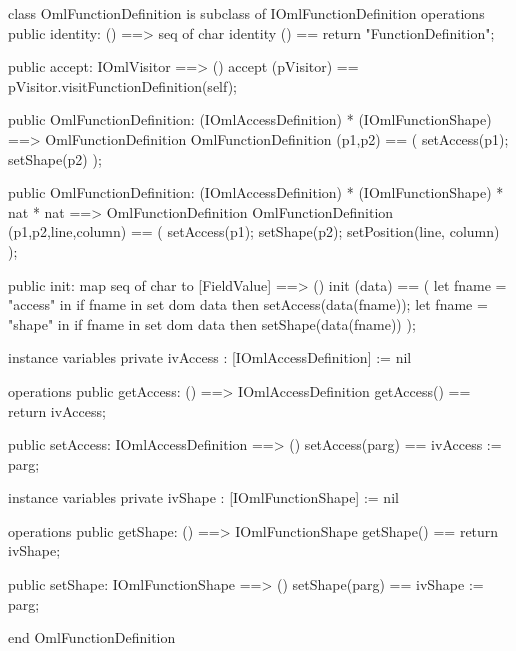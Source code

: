 \begin{vdm_al}
class OmlFunctionDefinition is subclass of IOmlFunctionDefinition
operations
  public identity: () ==> seq of char
  identity () == return "FunctionDefinition";

  public accept: IOmlVisitor ==> ()
  accept (pVisitor) == pVisitor.visitFunctionDefinition(self);

  public OmlFunctionDefinition:
    (IOmlAccessDefinition) *
    (IOmlFunctionShape) ==> OmlFunctionDefinition
  OmlFunctionDefinition (p1,p2) == 
    ( setAccess(p1);
      setShape(p2) );

  public OmlFunctionDefinition:
    (IOmlAccessDefinition) *
    (IOmlFunctionShape) *
    nat *
    nat ==> OmlFunctionDefinition
  OmlFunctionDefinition (p1,p2,line,column) == 
    ( setAccess(p1);
      setShape(p2);
      setPosition(line, column) );

  public init: map seq of char to [FieldValue] ==> ()
  init (data) ==
    ( let fname = "access" in
        if fname in set dom data
        then setAccess(data(fname));
      let fname = "shape" in
        if fname in set dom data
        then setShape(data(fname)) );

instance variables
  private ivAccess : [IOmlAccessDefinition] := nil

operations
  public getAccess: () ==> IOmlAccessDefinition
  getAccess() == return ivAccess;

  public setAccess: IOmlAccessDefinition ==> ()
  setAccess(parg) == ivAccess := parg;

instance variables
  private ivShape : [IOmlFunctionShape] := nil

operations
  public getShape: () ==> IOmlFunctionShape
  getShape() == return ivShape;

  public setShape: IOmlFunctionShape ==> ()
  setShape(parg) == ivShape := parg;

end OmlFunctionDefinition
\end{vdm_al}

